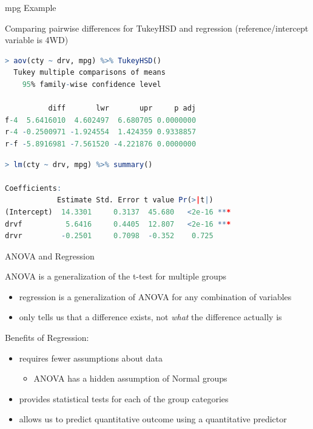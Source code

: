 \documentclass{beamer}
\begin{document}
\begin{frame}[fragile]{mpg Example}

Comparing pairwise differences for TukeyHSD and regression (reference/intercept variable is 4WD)

\begin{lstlisting}[language=R]
> aov(cty ~ drv, mpg) %>% TukeyHSD()
  Tukey multiple comparisons of means
    95% family-wise confidence level

          diff       lwr       upr     p adj
f-4  5.6416010  4.602497  6.680705 0.0000000
r-4 -0.2500971 -1.924554  1.424359 0.9338857
r-f -5.8916981 -7.561520 -4.221876 0.0000000
\end{lstlisting}
\begin{lstlisting}[language=R]
> lm(cty ~ drv, mpg) %>% summary() 

Coefficients:
            Estimate Std. Error t value Pr(>|t|)    
(Intercept)  14.3301     0.3137  45.680   <2e-16 ***
drvf          5.6416     0.4405  12.807   <2e-16 ***
drvr         -0.2501     0.7098  -0.352    0.725    

\end{lstlisting}

\end{frame}

\begin{frame}{ANOVA and Regression}

ANOVA is a generalization of the t-test for multiple groups
\begin{itemize}
    \item regression is a generalization of ANOVA for any combination of variables
    \item only tells us that a difference exists, not \textit{what} the difference actually is
\end{itemize} \vspace{10mm}

Benefits of Regression:
\begin{itemize}
    \item requires fewer assumptions about data
    \begin{itemize}
        \item ANOVA has a hidden assumption of Normal groups
    \end{itemize}
    \item provides statistical tests for each of the group categories
    \item allows us to predict quantitative outcome using a quantitative predictor
\end{itemize}
\end{frame}
\end{document}
